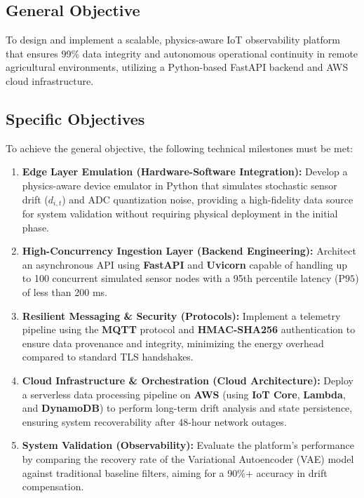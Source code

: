 \documentclass[conference]{IEEEtran}
\begin{document}
\subsection{General Objective}

To design and implement a scalable, physics-aware IoT observability platform that ensures 99\% data integrity and autonomous operational continuity in remote agricultural environments, utilizing a Python-based FastAPI backend and AWS cloud infrastructure.

\subsection{Specific Objectives}

To achieve the general objective, the following technical milestones must be met:

\begin{enumerate}
    \item \textbf{Edge Layer Emulation (Hardware-Software Integration):} Develop a physics-aware device emulator in Python that simulates stochastic sensor drift ($d_{i,t}$) and ADC quantization noise, providing a high-fidelity data source for system validation without requiring physical deployment in the initial phase.
    \item \textbf{High-Concurrency Ingestion Layer (Backend Engineering):} Architect an asynchronous API using \textbf{FastAPI} and \textbf{Uvicorn} capable of handling up to 100 concurrent simulated sensor nodes with a 95th percentile latency ($\text{P95}$) of less than 200 ms.

    \item \textbf{Resilient Messaging \& Security (Protocols):} Implement a telemetry pipeline using the \textbf{MQTT} protocol and \textbf{HMAC-SHA256} authentication to ensure data provenance and integrity, minimizing the energy overhead compared to standard TLS handshakes.

    \item \textbf{Cloud Infrastructure \& Orchestration (Cloud Architecture):} Deploy a serverless data processing pipeline on \textbf{AWS} (using \textbf{IoT Core}, \textbf{Lambda}, and \textbf{DynamoDB}) to perform long-term drift analysis and state persistence, ensuring system recoverability after 48-hour network outages.

    \item \textbf{System Validation (Observability):} Evaluate the platform's performance by comparing the recovery rate of the Variational Autoencoder (VAE) model against traditional baseline filters, aiming for a 90\%+ accuracy in drift compensation.
\end{enumerate}
\end{document}
